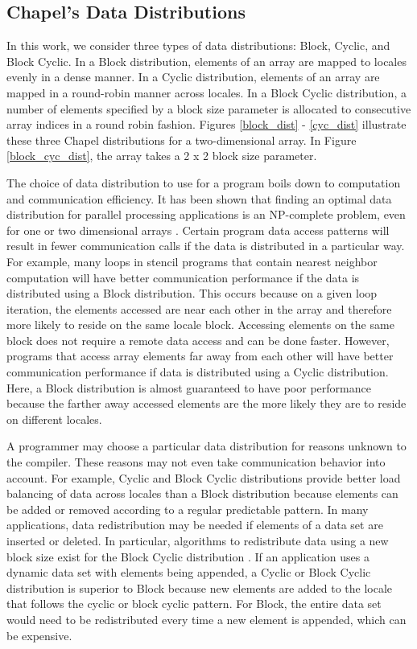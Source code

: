 \subsection{Chapel's Data Distributions} 

In this work, we consider three types of data distributions: Block, Cyclic, and Block Cyclic. In a Block distribution, elements of an array are mapped to locales evenly in a dense manner. In a Cyclic distribution, elements of an array are mapped in a round-robin manner across locales. In a Block Cyclic distribution, a number of elements specified by a block size parameter is allocated to consecutive array indices in a round robin fashion. Figures \ref{block_dist} - \ref{cyc_dist} illustrate these three Chapel distributions for a two-dimensional array. In Figure \ref{block_cyc_dist}, the array takes a 2 x 2 block size parameter. 

The choice of data distribution to use for a program boils down to computation and communication efficiency. It has been shown that finding an optimal data distribution for parallel processing applications is an NP-complete problem, even for one or two dimensional arrays \cite{mace1987memory}. Certain program data access patterns will result in fewer communication calls if the data is distributed in a particular way. For example, many loops in stencil programs that contain nearest neighbor computation will have better communication performance if the data is distributed using a Block distribution. This occurs because on a given loop iteration, the elements accessed are near each other in the array and therefore more likely to reside on the same locale block. Accessing elements on the same block does not require a remote data access and can be done faster. However, programs that access array elements far away from each other will have better communication performance if data is distributed using a Cyclic distribution. Here, a Block distribution is almost guaranteed to have poor performance because the farther away accessed elements are the more likely they are to reside on different locales. 

A programmer may choose a particular data distribution for reasons unknown to the compiler. These reasons may not even take communication behavior into account. For example, Cyclic and Block Cyclic distributions provide better load balancing of data across locales than a Block distribution because elements can be added or removed according to a regular predictable pattern. In many applications, data redistribution may be needed if elements of a data set are inserted or deleted. In particular, algorithms to redistribute data using a new block size exist for the Block Cyclic distribution \cite{walker1996redistribution, prylli1997fast}. If an application uses a dynamic data set with elements being appended, a Cyclic or Block Cyclic distribution is superior to Block because new elements are added to the locale that follows the cyclic or block cyclic pattern. For Block, the entire data set would need to be redistributed every time a new element is appended, which can be expensive. 

